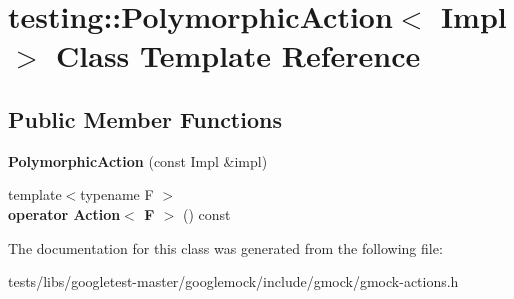 \hypertarget{classtesting_1_1PolymorphicAction}{}\section{testing\+:\+:Polymorphic\+Action$<$ Impl $>$ Class Template Reference}
\label{classtesting_1_1PolymorphicAction}
\subsection*{Public Member Functions}
\begin{DoxyCompactItemize}
\item 
\mbox{\label{classtesting_1_1PolymorphicAction_a062e5a45ad61dcf8085b15cc882ca0ae}} 
{\bfseries Polymorphic\+Action} (const Impl \&impl)
\item 
\mbox{\label{classtesting_1_1PolymorphicAction_ac35461616cc15c06f1a2f9ee1c03fb8f}} 
{\footnotesize template$<$typename F $>$ }\\{\bfseries operator Action$<$ F $>$} () const
\end{DoxyCompactItemize}


The documentation for this class was generated from the following file\+:\begin{DoxyCompactItemize}
\item 
tests/libs/googletest-\/master/googlemock/include/gmock/gmock-\/actions.\+h\end{DoxyCompactItemize}
